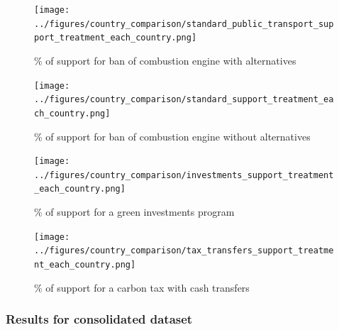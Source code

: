 \begin{frame}{}%
\begin{figure}[h!]
\caption{\% of support for ban of combustion engine with alternatives} %
\texttt{[image: ../figures/country\_comparison/standard\_public\_transport\_support\_treatment\_each\_country.png]} \\
\end{figure}
\end{frame}

\begin{frame}{}%
\begin{figure}[h!]
\caption{\% of support for ban of combustion engine without alternatives} %
\texttt{[image: ../figures/country\_comparison/standard\_support\_treatment\_each\_country.png]} \\
\end{figure}
\end{frame}

\begin{frame}{}%
\begin{figure}[h!]
\caption{\% of support for a green investments program} %
\texttt{[image: ../figures/country\_comparison/investments\_support\_treatment\_each\_country.png]} \\
\end{figure}
\end{frame}

\begin{frame}{}%
\begin{figure}[h!]
\caption{\% of support for a carbon tax with cash transfers} %
\texttt{[image: ../figures/country\_comparison/tax\_transfers\_support\_treatment\_each\_country.png]} \\
\end{figure}
\end{frame}
\subsubsection{Results for consolidated dataset}

